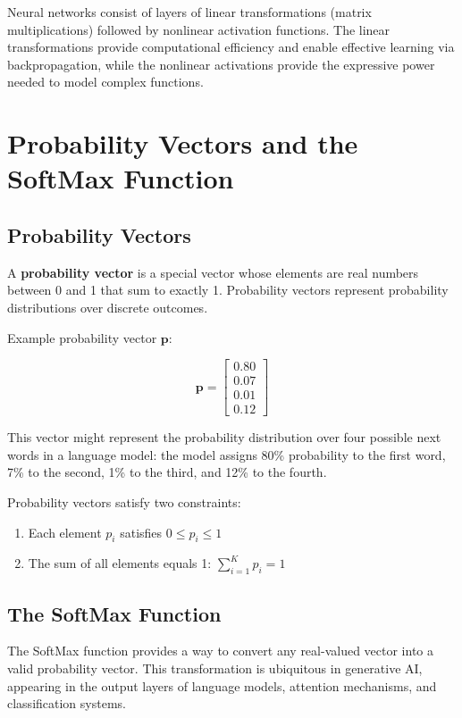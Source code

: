 \documentclass{book}
\begin{document}
Neural networks consist of layers of linear transformations (matrix multiplications) followed by nonlinear activation functions. The linear transformations provide computational efficiency and enable effective learning via backpropagation, while the nonlinear activations provide the expressive power needed to model complex functions.

\section{Probability Vectors and the SoftMax Function}

\subsection{Probability Vectors}

A \textbf{probability vector} is a special vector whose elements are real numbers between 0 and 1 that sum to exactly 1. Probability vectors represent probability distributions over discrete outcomes.

Example probability vector $\mathbf{p}$:

\begin{equation}
\mathbf{p} = \begin{bmatrix}
0.80 \\
0.07 \\
0.01 \\
0.12
\end{bmatrix}
\end{equation}

This vector might represent the probability distribution over four possible next words in a language model: the model assigns 80\% probability to the first word, 7\% to the second, 1\% to the third, and 12\% to the fourth.

Probability vectors satisfy two constraints:
\begin{enumerate}
\item Each element $p_i$ satisfies $0 \leq p_i \leq 1$
\item The sum of all elements equals 1: $\sum_{i=1}^{K} p_i = 1$
\end{enumerate}

\subsection{The SoftMax Function}

The SoftMax function provides a way to convert any real-valued vector into a valid probability vector. This transformation is ubiquitous in generative AI, appearing in the output layers of language models, attention mechanisms, and classification systems.
\end{document}
